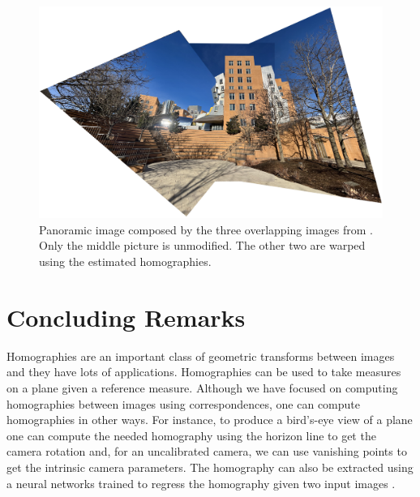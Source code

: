 \begin{figure}
\centerline{
\includegraphics[width=1\linewidth]{figures/homography/panorama.jpg}
}
\caption{Panoramic image composed by the three overlapping images from \fig{\ref{fig:example_three_images}}. Only the middle picture is unmodified. The other two are warped using the estimated homographies.}
\label{fig:panorama}
\end{figure}


\section{Concluding Remarks}

Homographies are an important class of geometric transforms between images and they have lots of applications. Homographies can be used to take measures on a plane given a reference measure.  Although we have focused on computing homographies between images using correspondences, one can compute homographies in other ways. For instance, to produce a bird's-eye view of a plane one can compute the needed homography using the horizon line to get the camera rotation and, for an uncalibrated camera, we can use vanishing points to get the intrinsic camera parameters.  The homography can also be extracted using a neural networks trained to regress the homography given two input images \cite{abbas2019geometric}. 



